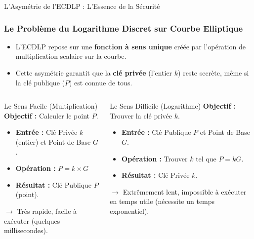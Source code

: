 \begin{frame}{L'Asymétrie de l'ECDLP : L'Essence de la Sécurité}
\frametitle{Le Problème du Logarithme Discret sur Courbe Elliptique}

\begin{itemize}
    \item L'ECDLP repose sur une \textbf{fonction à sens unique} créée par l'opération de multiplication scalaire sur la courbe.
    \item Cette asymétrie garantit que la \textbf{clé privée} (l'entier $k$) reste secrète, même si la clé publique ($P$) est connue de tous.
\end{itemize}

\begin{columns}
    \begin{block}{Le Sens Facile (Multiplication)}
        \textbf{Objectif :} Calculer le point $P$.
        \begin{itemize}
            \item \textbf{Entrée :} Clé Privée $k$ (entier) et Point de Base $G$.
            \item \textbf{Opération :} $P = k \times G$
            \item \textbf{Résultat :} Clé Publique $P$ (point).
        \end{itemize}
        $\rightarrow$ Très rapide, facile à exécuter (quelques millisecondes).
    \end{block}
    
    \begin{block}{Le Sens Difficile (Logarithme)}
        \textbf{Objectif :} Trouver la clé privée $k$.
        \begin{itemize}
            \item \textbf{Entrée :} Clé Publique $P$ et Point de Base $G$.
            \item \textbf{Opération :} Trouver $k$ tel que $P = kG$.
            \item \textbf{Résultat :} Clé Privée $k$.
        \end{itemize}
        $\rightarrow$ Extrêmement lent, impossible à exécuter en temps utile (nécessite un temps exponentiel).
    \end{block}
\end{columns}

\end{frame}

